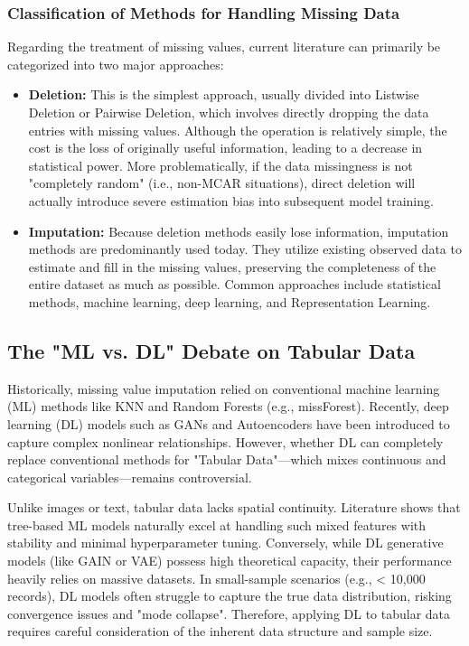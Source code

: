 \documentclass[twocolumn, 9pt]{extarticle}
\begin{document}
\subsubsection{Classification of Methods for Handling Missing Data}
Regarding the treatment of missing values, current literature can primarily be categorized into two major approaches\cite{zhou2024comprehensive}:
\begin{itemize}[itemsep=2pt, parsep=0pt, topsep=4pt]
    \item \textbf{Deletion:} This is the simplest approach, usually divided into Listwise Deletion or Pairwise Deletion, which involves directly dropping the data entries with missing values. Although the operation is relatively simple, the cost is the loss of originally useful information, leading to a decrease in statistical power. More problematically, if the data missingness is not "completely random" (i.e., non-MCAR situations), direct deletion will actually introduce severe estimation bias into subsequent model training.
    \item \textbf {Imputation:} Because deletion methods easily lose information, imputation methods are predominantly used today. They utilize existing observed data to estimate and fill in the missing values, preserving the completeness of the entire dataset as much as possible. Common approaches include statistical methods, machine learning, deep learning, and Representation Learning.
\end{itemize}

\subsection{The "ML vs. DL" Debate on Tabular Data}
Historically, missing value imputation relied on conventional machine learning (ML) methods like KNN and Random Forests (e.g., missForest). Recently, deep learning (DL) models such as GANs and Autoencoders have been introduced to capture complex nonlinear relationships.\cite{shahbazian2023generative} However, whether DL can completely replace conventional methods for "Tabular Data"—which mixes continuous and categorical variables—remains controversial.

Unlike images or text, tabular data lacks spatial continuity. Literature shows that tree-based ML models naturally excel at handling such mixed features with stability and minimal hyperparameter tuning. Conversely, while DL generative models (like GAIN or VAE) possess high theoretical capacity, their performance heavily relies on massive datasets. In small-sample scenarios (e.g., < 10,000 records), DL models often struggle to capture the true data distribution, risking convergence issues and "mode collapse".\cite{sun2023deep} Therefore, applying DL to tabular data requires careful consideration of the inherent data structure and sample size.
\end{document}

